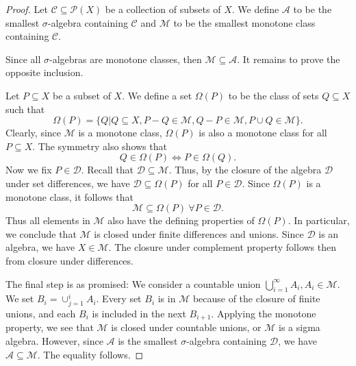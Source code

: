 \documentclass[prb,12pt]{revtex4-2}
\theoremstyle{definition}
\theoremstyle{definition}
\begin{document}
\begin{proof}
	Let $\mathcal{C}\subseteq \mathcal{P}(X)$ be a collection of subsets of $X$. We define $\mathcal{A}$ to be the smallest $\sigma$-algebra containing $\mathcal{C}$ and $\mathcal{M}$ to be the smallest monotone class containing $\mathcal{C}$. 

	Since all $\sigma$-algebras are monotone classes, then $\mathcal{M}\subseteq \mathcal{A}$. It remains to prove the opposite inclusion.

	Let $P\subseteq X$ be a subset of $X$. We define a set $\Omega(P)$ to be the class of sets $Q\subseteq X$ such that
	\[
	\Omega(P)=\{Q|Q\subseteq X,P-Q\in \mathcal{M},Q-P\in \mathcal{M},P\cup Q\in \mathcal{M}\}
	.\] 
Clearly, since $\mathcal{M}$ is a monotone class, $\Omega(P)$ is also a monotone class for all $P\subseteq X$. The symmetry also shows that
\[
Q\in \Omega(P) \iff P\in \Omega(Q)
.\] 
Now we fix $P\in \mathcal{D}$. Recall that $\mathcal{D}\subseteq \mathcal{M}$. Thus, by the closure of the algebra $\mathcal{D}$ under set differences, we have $\mathcal{D}\subseteq \Omega(P)$ for all $P\in \mathcal{D}$. Since $\Omega(P)$ is a monotone class, it follows that
\[
\mathcal{M}\subseteq \Omega(P)~\forall P\in \mathcal{D}
.\] 
Thus all elements in $\mathcal{M}$ also have the defining properties of $\Omega(P)$. In particular, we conclude that $\mathcal{M}$ is closed under finite differences and unions. Since $\mathcal{D}$ is an algebra, we have $X\in \mathcal{M}$. The closure under complement property follows then from closure under differences.

The final step is as promised: We consider a countable union $\bigcup_{i=1}^\infty A_i, A_i\in \mathcal{M}$. We set $B_i=\cup_{j=1}^i A_i$. Every set $B_i$ is in $\mathcal{M}$ because of the closure of finite unions, and each $B_i$ is included in the next $B_{i+1}$. Applying the monotone property, we see that $\mathcal{M}$ is closed under countable unions, or $\mathcal{M}$ is a sigma algebra. However, since $\mathcal{A}$ is the smallest $\sigma$-algebra containing $\mathcal{D}$, we have $\mathcal{A}\subseteq \mathcal{M}$. The equality follows.
\end{proof}
\end{document}
